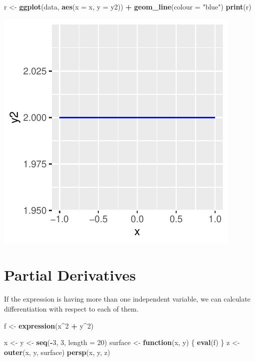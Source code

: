 \documentclass[]{book}
\newenvironment{Shaded}{\begin{snugshade}}{\end{snugshade}}
\newcommand{\ControlFlowTok}[1]{\textcolor[rgb]{0.13,0.29,0.53}{\textbf{#1}}}
\newcommand{\DataTypeTok}[1]{\textcolor[rgb]{0.13,0.29,0.53}{#1}}
\newcommand{\DecValTok}[1]{\textcolor[rgb]{0.00,0.00,0.81}{#1}}
\newcommand{\KeywordTok}[1]{\textcolor[rgb]{0.13,0.29,0.53}{\textbf{#1}}}
\newcommand{\NormalTok}[1]{#1}
\newcommand{\OperatorTok}[1]{\textcolor[rgb]{0.81,0.36,0.00}{\textbf{#1}}}
\newcommand{\StringTok}[1]{\textcolor[rgb]{0.31,0.60,0.02}{#1}}
\begin{document}
\begin{Shaded}
\begin{Highlighting}[]
\NormalTok{r <-}\StringTok{ }\KeywordTok{ggplot}\NormalTok{(data, }\KeywordTok{aes}\NormalTok{(}\DataTypeTok{x =}\NormalTok{ x, }\DataTypeTok{y =}\NormalTok{ y2)) }\OperatorTok{+}
\StringTok{  }\KeywordTok{geom_line}\NormalTok{(}\DataTypeTok{colour =} \StringTok{"blue"}\NormalTok{)}
\KeywordTok{print}\NormalTok{(r)}
\end{Highlighting}
\end{Shaded}

\includegraphics{bookdown-demo_files/figure-latex/unnamed-chunk-10-3.pdf}

\hypertarget{partial-derivatives}{%
\section{Partial Derivatives}\label{partial-derivatives}}

If the expression is having more than one independent variable, we can calculate differentiation with respect to each of them.

\begin{Shaded}
\begin{Highlighting}[]
\NormalTok{f <-}\StringTok{ }\KeywordTok{expression}\NormalTok{(x}\OperatorTok{^}\DecValTok{2} \OperatorTok{+}\StringTok{ }\NormalTok{y}\OperatorTok{^}\DecValTok{2}\NormalTok{)}

\NormalTok{x <-}\StringTok{ }\NormalTok{y <-}\StringTok{ }\KeywordTok{seq}\NormalTok{(}\OperatorTok{-}\DecValTok{3}\NormalTok{, }\DecValTok{3}\NormalTok{, }\DataTypeTok{length =} \DecValTok{20}\NormalTok{)}
\NormalTok{surface <-}\StringTok{ }\ControlFlowTok{function}\NormalTok{(x, y) \{}
  \KeywordTok{eval}\NormalTok{(f)}
\NormalTok{\}}
\NormalTok{z <-}\StringTok{ }\KeywordTok{outer}\NormalTok{(x, y, surface)}
\KeywordTok{persp}\NormalTok{(x, y, z)}
\end{Highlighting}
\end{Shaded}
\end{document}
